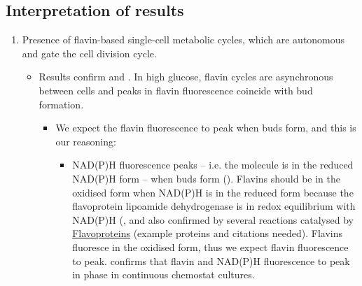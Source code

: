 \subsection{Interpretation of results}
\label{subsec:biology-discussion-interpretation}
\begin{enumerate}
\item Presence of flavin-based single-cell metabolic cycles, which are autonomous and gate the cell division cycle.
\begin{itemize}
\item Results confirm \textcite{papagiannakisAutonomousMetabolicOscillations2017} and \textcite{baumgartnerFlavinbasedMetabolicCycles2018}.  In high glucose, flavin cycles are asynchronous between cells and peaks in flavin fluorescence coincide with bud formation.
\begin{itemize}
\item We expect the flavin fluorescence to peak when buds form, and this is our reasoning:
\begin{itemize}
\item NAD(P)H fluorescence peaks -- i.e. the molecule is in the reduced NAD(P)H form -- when buds form (\textcite{papagiannakisAutonomousMetabolicOscillations2017}).  Flavins should be in the oxidised form when NAD(P)H is in the reduced form because the flavoprotein lipoamide dehydrogenase is in redox equilibrium with NAD(P)H (\textcite{sianoNADHFlavinFluorescence1989}, and also confirmed by several reactions catalysed by \href{Flavoproteins.org}{Flavoproteins} (example proteins and citations needed).  Flavins fluoresce in the oxidised form, thus we expect flavin fluorescence to peak. \textcite{murrayRedoxRegulationRespiring2011} confirms that flavin and NAD(P)H fluorescence to peak in phase in continuous chemostat cultures.
\end{itemize}


\end{itemize}
\end{itemize}
\end{enumerate}
